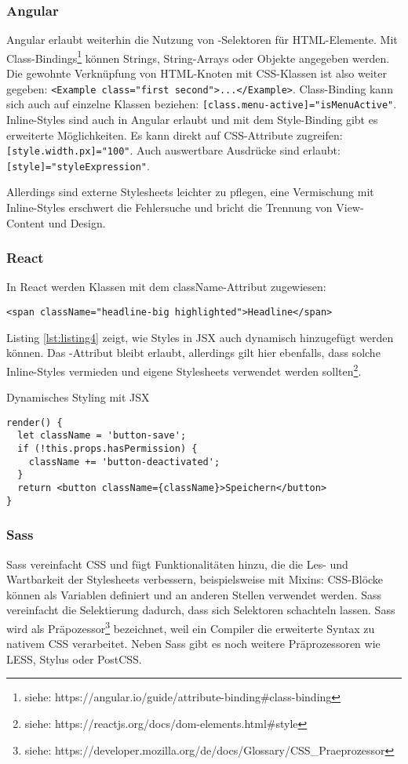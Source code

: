 \subsubsection{Angular}
Angular erlaubt weiterhin die Nutzung von -Selektoren für HTML-Elemente. Mit Class-Bindings\footnote{siehe: https://angular.io/guide/attribute-binding\#class-binding} können Strings, String-Arrays oder Objekte angegeben werden. Die gewohnte Verknüpfung von HTML-Knoten mit CSS-Klassen ist also weiter gegeben: \texttt{<Example class="first second">...</Example>}. Class-Binding kann sich auch auf einzelne Klassen beziehen: \texttt{[class.menu-active]="isMenuActive"}. Inline-Styles sind auch in Angular erlaubt und mit dem Style-Binding gibt es erweiterte Möglichkeiten. Es kann direkt auf CSS-Attribute zugreifen: \texttt{[style.width.px]="100"}. Auch auswertbare Ausdrücke sind erlaubt: \texttt{[style]="styleExpression"}.

Allerdings sind externe Stylesheets leichter zu pflegen, eine Vermischung mit Inline-Styles erschwert die Fehlersuche und bricht die Trennung von View-Content und Design.

\subsubsection{React}
In React werden Klassen mit dem className-Attribut zugewiesen:

\texttt{<span className="headline-big highlighted">Headline</span>}

Listing \ref{lst:listing4} zeigt, wie Styles in JSX auch dynamisch hinzugefügt werden können. Das -Attribut bleibt erlaubt, allerdings gilt hier ebenfalls, dass solche Inline-Styles vermieden und eigene Stylesheets verwendet werden sollten\footnote{siehe: https://reactjs.org/docs/dom-elements.html\#style}.\cite{StylingReact}

\begin{listing}
\caption{Dynamisches Styling mit JSX}
\label{lst:listing4}
\begin{verbatim}
render() {
  let className = 'button-save';
  if (!this.props.hasPermission) {
    className += 'button-deactivated';
  }
  return <button className={className}>Speichern</button>
}
\end{verbatim}
\end{listing}

\subsubsection{Sass}
Sass vereinfacht CSS und fügt Funktionalitäten hinzu, die die Les- und Wartbarkeit der Stylesheets verbessern, beispielsweise mit Mixins: CSS-Blöcke können als Variablen definiert und an anderen Stellen verwendet werden. Sass vereinfacht die Selektierung dadurch, dass sich Selektoren schachteln lassen. Sass wird als Präpozessor\footnote{siehe: https://developer.mozilla.org/de/docs/Glossary/CSS\_Praeprozessor} bezeichnet, weil ein Compiler die erweiterte Syntax zu nativem CSS verarbeitet. Neben Sass gibt es noch weitere Präprozessoren wie LESS, Stylus oder PostCSS.

